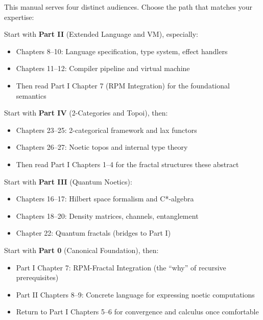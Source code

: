 \documentclass[11pt,twoside,openright]{book}
\theoremstyle{definition}
\theoremstyle{plain}
\theoremstyle{remark}
\begin{document}
This manual serves four distinct audiences. Choose the path that matches your expertise:

\begin{description}[style=nextline,leftmargin=2cm]

\item[\textbf{PL / Compiler Researchers}]
Start with \textbf{Part II} (Extended Language and VM), especially:
\begin{itemize}
  \item Chapters 8--10: Language specification, type system, effect handlers
  \item Chapters 11--12: Compiler pipeline and virtual machine
  \item Then read Part I Chapter 7 (RPM Integration) for the foundational semantics
\end{itemize}

\item[\textbf{Category Theorists / Algebraists}]
Start with \textbf{Part IV} (2-Categories and Topoi), then:
\begin{itemize}
  \item Chapters 23--25: 2-categorical framework and lax functors
  \item Chapters 26--27: Noetic topos and internal type theory
  \item Then read Part I Chapters 1--4 for the fractal structures these abstract
\end{itemize}

\item[\textbf{Quantum Information / Physics}]
Start with \textbf{Part III} (Quantum Noetics):
\begin{itemize}
  \item Chapters 16--17: Hilbert space formalism and C*-algebra
  \item Chapters 18--20: Density matrices, channels, entanglement
  \item Chapter 22: Quantum fractals (bridges to Part I)
\end{itemize}

\item[\textbf{Metaphysics / TKS Practitioners}]
Start with \textbf{Part 0} (Canonical Foundation), then:
\begin{itemize}
  \item Part I Chapter 7: RPM-Fractal Integration (the ``why'' of recursive prerequisites)
  \item Part II Chapters 8--9: Concrete language for expressing noetic computations
  \item Return to Part I Chapters 5--6 for convergence and calculus once comfortable
\end{itemize}

\end{description}
\end{document}
